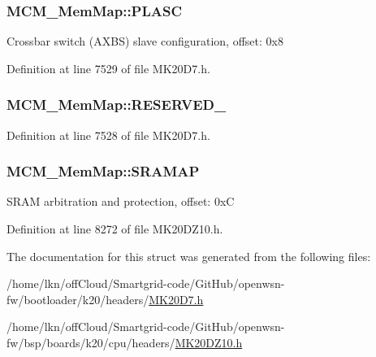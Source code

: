 \subsubsection[{\texorpdfstring{P\+L\+A\+SC}{PLASC}}]{ M\+C\+M\+\_\+\+Mem\+Map\+::\+P\+L\+A\+SC}\hypertarget{struct_m_c_m___mem_map_ad68f64d82524bb0b181a837967b8e248}{}\label{struct_m_c_m___mem_map_ad68f64d82524bb0b181a837967b8e248}
Crossbar switch (A\+X\+BS) slave configuration, offset\+: 0x8 

Definition at line 7529 of file M\+K20\+D7.\+h.

\subsubsection[{\texorpdfstring{R\+E\+S\+E\+R\+V\+E\+D\+\_\+0}{RESERVED_0}}]{ M\+C\+M\+\_\+\+Mem\+Map\+::\+R\+E\+S\+E\+R\+V\+E\+D\+\_}\hypertarget{struct_m_c_m___mem_map_a236367d6d2f66f8132667a66f231634e}{}\label{struct_m_c_m___mem_map_a236367d6d2f66f8132667a66f231634e}


Definition at line 7528 of file M\+K20\+D7.\+h.

\subsubsection[{\texorpdfstring{S\+R\+A\+M\+AP}{SRAMAP}}]{ M\+C\+M\+\_\+\+Mem\+Map\+::\+S\+R\+A\+M\+AP}\hypertarget{struct_m_c_m___mem_map_a7e427ba6d40677a375476077fd051b04}{}\label{struct_m_c_m___mem_map_a7e427ba6d40677a375476077fd051b04}
S\+R\+AM arbitration and protection, offset\+: 0xC 

Definition at line 8272 of file M\+K20\+D\+Z10.\+h.



The documentation for this struct was generated from the following files\+:\begin{DoxyCompactItemize}
\item 
/home/lkn/off\+Cloud/\+Smartgrid-\/code/\+Git\+Hub/openwsn-\/fw/bootloader/k20/headers/\hyperlink{bootloader_2k20_2headers_2_m_k20_d7_8h}{M\+K20\+D7.\+h}\item 
/home/lkn/off\+Cloud/\+Smartgrid-\/code/\+Git\+Hub/openwsn-\/fw/bsp/boards/k20/cpu/headers/\hyperlink{_m_k20_d_z10_8h}{M\+K20\+D\+Z10.\+h}\end{DoxyCompactItemize}
